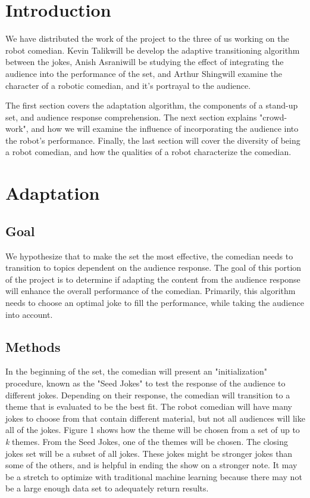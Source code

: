 \documentclass[onecolumn, draftclsnofoot,10pt, compsoc]{IEEEtran}
\def \GroupMemberOne{     Arthur Shing}
\def \GroupMemberTwo{			Kevin Talik}
\def \GroupMemberThree{   Anish Asrani}
\begin{document}
\section{Introduction}
  We have distributed the work of the project to the three of us working on the robot comedian. \GroupMemberTwo  will be develop the adaptive transitioning algorithm between the jokes, \GroupMemberThree  will be studying the effect of integrating the audience into the performance of the set, and \GroupMemberOne  will examine the character of a robotic comedian, and it's portrayal to the audience.

  The first section covers the adaptation algorithm, the components of a stand-up set, and audience response comprehension. The next section explains "crowd-work", and how we will examine the influence of incorporating the audience into the robot's performance. Finally, the last section will cover the diversity of being a robot comedian, and how the qualities of a robot characterize the comedian.

\section{Adaptation}
\subsection{Goal}
  We hypothesize that to make the set the most effective, the comedian needs to transition to topics dependent on the audience response. The goal of this portion of the project is to determine if adapting the content from the audience response will enhance the overall performance of the comedian. Primarily, this algorithm needs to choose an optimal joke to fill the performance, while taking the audience into account.
\subsection{Methods}
In the beginning of the set, the comedian will present an "initialization" procedure, known as the "Seed Jokes" to test the response of the audience to different jokes. Depending on their response, the comedian will transition to a theme that is evaluated to be the best fit. The robot comedian will have many jokes to choose from that contain different material, but not all audiences will like all of the jokes. Figure 1 shows how the theme will be chosen from a set of up to \textit{k} themes. From the Seed Jokes, one of the themes will be chosen. The closing jokes set will be a subset of all jokes. These jokes might be stronger jokes than some of the others, and is helpful in ending the show on a stronger note. It may be a stretch to optimize with traditional machine learning because there may not be a large enough data set to adequately return results.
\end{document}

